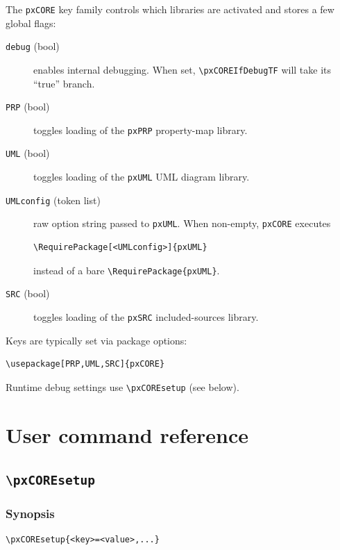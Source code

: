 \documentclass[11pt,a4paper]{article}
\begin{document}
The \texttt{pxCORE} key family controls which libraries are activated and
stores a few global flags:

\begin{description}
  \item[\texttt{debug} (bool)] enables internal debugging.
    When set, \verb|\pxCOREIfDebugTF| will take its “true” branch.

  \item[\texttt{PRP} (bool)] toggles loading of the \texttt{pxPRP}
    property-map library.

  \item[\texttt{UML} (bool)] toggles loading of the \texttt{pxUML}
    UML diagram library.

  \item[\texttt{UMLconfig} (token list)] raw option string passed to
    \texttt{pxUML}. When non-empty, \texttt{pxCORE} executes
\begin{verbatim}
\RequirePackage[<UMLconfig>]{pxUML}
\end{verbatim}
    instead of a bare \verb|\RequirePackage{pxUML}|.

  \item[\texttt{SRC} (bool)] toggles loading of the \texttt{pxSRC}
    included-sources library.
\end{description}

Keys are typically set via package options:

\begin{verbatim}
\usepackage[PRP,UML,SRC]{pxCORE}
\end{verbatim}

Runtime debug settings use \verb|\pxCOREsetup| (see below).

\section{User command reference}

\subsection{\texttt{\textbackslash pxCOREsetup}}

\subsubsection*{Synopsis}

\begin{verbatim}
\pxCOREsetup{<key>=<value>,...}
\end{verbatim}
\end{document}
